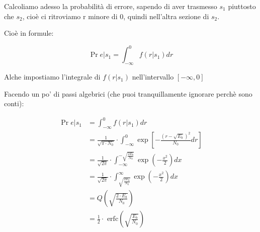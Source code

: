 Calcoliamo adesso la probabilità di errore, 
sapendo di aver trasmesso $s_1$ piuttosto che $s_2$, 
cioè ci ritroviamo r minore di 0, 
quindi nell'altra sezione di $s_2$. \newline  

Cioè in formule: 

{
    \Large 
    \begin{equation}
        \Pr {e | s_1}
        = 
        \int_{- \infty}^{0}
        f(r | s_1)
        dr
    \end{equation}
}

\begin{tcolorbox}
    Alche impostiamo l'integrale di $f(r | s_1)$ nell'intervallo $[-\infty, 0]$
\end{tcolorbox}


Facendo un po' di passi algebrici (che puoi tranquillamente ignorare perchè sono conti): 

{
    \Large 
    \begin{equation}
        \begin{split}
        \Pr {e | s_1}
        &= 
        \int_{- \infty}^{0}
        f(r | s_1)
        dr
        \\
        &= 
        \frac{1}{\sqrt{\pi \cdot N_0}}
        \cdot 
        \int_{- \infty}^{0}
        \exp 
        \left[
        - 
        \frac{(r - \sqrt{E_b})^{2}}{N_0}
        dr 
        \right]
        \\
        &= 
        \frac{1}{\sqrt{2 \pi }}
        \cdot 
        \int_{- \infty}^{- \sqrt{\frac{2 E_b}{N_0}}}
        \exp(
        - 
        \frac{x^{2}}{2}
        ) 
        dx    
        \\
        &= 
        \frac{1}{\sqrt{2 \pi }}
        \cdot 
        \int_{\sqrt{\frac{2 E_b}{N_0}}}^{\infty}
        \exp(
        - 
        \frac{x^{2}}{2}
        ) 
        dx
        \\
        &= 
        Q \left( \sqrt{\frac{2 \cdot E_b}{N_0}}\right)
        \\
        &= 
        \frac{1}{2}
        \cdot
        \text{ erfc}
        \left(
            \sqrt{\frac{E_b}{N_0}}
        \right)
        \end{split}
    \end{equation}
}

